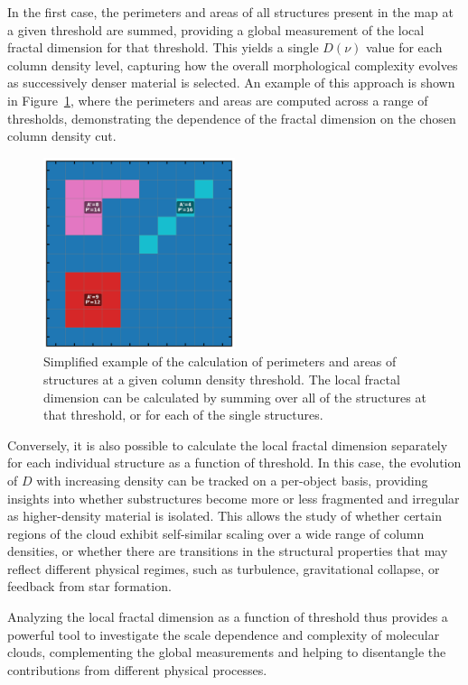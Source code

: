 In the first case, the perimeters and areas of all structures present in the map at a given threshold are summed, providing a global measurement of the local fractal dimension for that threshold. This yields a single $D(\nu)$ value for each column density level, capturing how the overall morphological complexity evolves as successively denser material is selected. An example of this approach is shown in Figure~\ref{fig:local_fractal_dimension_example}, where the perimeters and areas are computed across a range of thresholds, demonstrating the dependence of the fractal dimension on the chosen column density cut.

\begin{figure}[t]
    \centering
    \includegraphics[width=0.5\textwidth]{figures/example_calculations.png}
    \caption{Simplified example of the calculation of perimeters and areas of structures at a given column density threshold. The local fractal dimension can be calculated by summing over all of the structures at that threshold, or for each of the single structures.}
    \label{fig:local_fractal_dimension_example}
\end{figure}

Conversely, it is also possible to calculate the local fractal dimension separately for each individual structure as a function of threshold. In this case, the evolution of $D$ with increasing density can be tracked on a per-object basis, providing insights into whether substructures become more or less fragmented and irregular as higher-density material is isolated. This allows the study of whether certain regions of the cloud exhibit self-similar scaling over a wide range of column densities, or whether there are transitions in the structural properties that may reflect different physical regimes, such as turbulence, gravitational collapse, or feedback from star formation.

Analyzing the local fractal dimension as a function of threshold thus provides a powerful tool to investigate the scale dependence and complexity of molecular clouds, complementing the global measurements and helping to disentangle the contributions from different physical processes.

